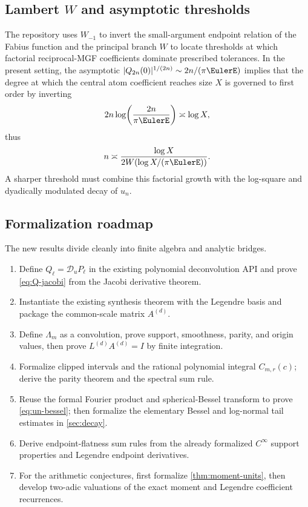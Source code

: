 \documentclass[11pt,oneside]{article}
\numberwithin{equation}{section}
\theoremstyle{definition}
\theoremstyle{remark}
\newcommand{\Dscr}{\mathscr D_u}
\begin{document}
\subsection{Lambert $W$ and asymptotic thresholds}

The repository uses $W_{-1}$ to invert the small-argument endpoint relation of
the Fabius function and the principal branch $W$ to locate thresholds at which
factorial reciprocal-MGF coefficients dominate prescribed tolerances.  In the
present setting, the asymptotic
$|Q_{2n}(0)|^{1/(2n)}\sim2n/(\pi\EulerE)$ implies that the degree at which the
central atom coefficient reaches size $X$ is governed to first order by
inverting
\[
 2n\log\!\left(\frac{2n}{\pi\EulerE}\right)\asymp\log X,
\]
thus
\begin{equation}
 n\asymp\frac{\log X}{2W(\log X/(\pi\EulerE))}.
 \label{eq:Lambert-threshold}
\end{equation}
A sharper threshold must combine this factorial growth with the log-square and
dyadically modulated decay of $u_n$.

\subsection{Formalization roadmap}

The new results divide cleanly into finite algebra and analytic bridges.
\begin{enumerate}
  \item Define $Q_\ell=\Dscr P_\ell$ in the existing polynomial
  deconvolution API and prove \eqref{eq:Q-jacobi} from the Jacobi derivative
  theorem.
  \item Instantiate the existing synthesis theorem with the Legendre basis and
  package the common-scale matrix $A^{(d)}$.
  \item Define $\Lambda_m$ as a convolution, prove support, smoothness, parity,
  and origin values, then prove $L^{(d)}A^{(d)}=I$ by finite integration.
  \item Formalize clipped intervals and the rational polynomial integral
  $C_{m,r}(c)$; derive the parity theorem and the spectral sum rule.
  \item Reuse the formal Fourier product and spherical-Bessel transform to
  prove \eqref{eq:un-bessel}; then formalize the elementary Bessel and
  log-normal tail estimates in \cref{sec:decay}.
  \item Derive endpoint-flatness sum rules from the already formalized
  $C^\infty$ support properties and Legendre endpoint derivatives.
  \item For the arithmetic conjectures, first formalize
  \cref{thm:moment-units}, then develop two-adic valuations of the exact moment
  and Legendre coefficient recurrences.
\end{enumerate}
\end{document}
